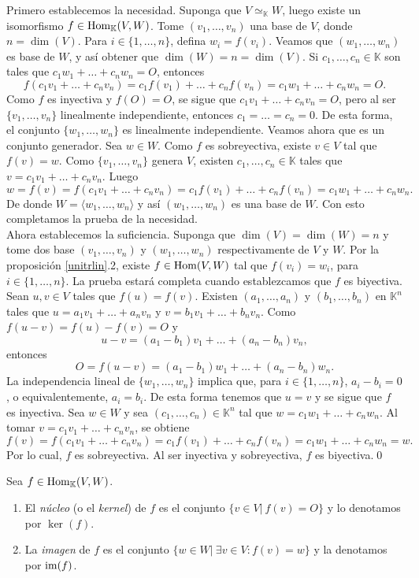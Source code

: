\dem Primero establecemos la necesidad. Suponga que $V\simeq_{\mathbb{K}} W$, luego existe un isomorfismo $f\in\operatorname{Hom}_{\mathbb{K}}(V,W)$. Tome $(v_1,\ldots,v_n)$ una base de $V$, donde $n=\dim(V)$. Para $i\in\{1,\ldots,n\}$, defina $w_i=f(v_i)$. Veamos que $(w_1,\ldots,w_n)$ es base de $W$, y así obtener que $\dim(W)=n=\dim(V)$. Si $c_1,\ldots,c_n\in \mathbb{K}$ son tales que $c_1w_1+\ldots+c_nw_n=O$, entonces
\[
f(c_1v_1+\ldots+c_nv_n)=c_1f(v_1)+\ldots+c_nf(v_n)=c_1w_1+\ldots+c_nw_n=O.
\]
Como $f$ es inyectiva y $f(O)=O$, se sigue que $c_1v_1+\ldots+c_nv_n=O$, pero al ser $\{v_1,\ldots,v_n\}$ linealmente independiente, entonces $c_1=\ldots=c_n=0$. De esta forma, el conjunto $\{w_1,\ldots,w_n\}$ es linealmente independiente. Veamos ahora que es un conjunto generador. Sea $w\in W$. Como $f$ es sobreyectiva, existe $v\in V$ tal que $f(v)=w$. Como $\{v_1,\ldots,v_n\}$ genera $V$, existen $c_1,\ldots,c_n\in \mathbb{K}$ tales que $v=c_1v_1+\ldots+c_nv_n$. Luego
\[
w=f(v)=f(c_1v_1+\ldots+c_nv_n)=c_1f(v_1)+\ldots+c_nf(v_n)=c_1w_1+\ldots+c_nw_n.
\]
De donde $W=\langle w_1,\ldots,w_n\rangle$ y as\'i $(w_1,\ldots,w_n)$ es una base de $W$. Con esto completamos la prueba de la necesidad.\\
Ahora establecemos la suficiencia. Suponga que $\dim(V)=\dim(W)=n$ y tome dos base $(v_1,\ldots,v_n)$ y $(w_1,\ldots,w_n)$ respectivamente de $V$ y $W$. Por la proposici\'on \ref{unitrlin}.2, existe $f\in\operatorname{Hom}(V,W)$ tal que $f(v_i)=w_i$, para $i\in\{1,\ldots,n\}$. La prueba estar\'a completa cuando establezcamos que $f$ es biyectiva. Sean $u,v\in V$ tales que $f(u)=f(v)$. Existen $(a_1,\ldots,a_n)$ y $(b_1,\ldots,b_n)$ en $\mathbb{K}^n$ tales que $u=a_1v_1+\ldots+a_nv_n$ y $v=b_1v_1+\ldots+b_nv_n$. Como $f(u-v)=f(u)-f(v)=O$ y
\[
u-v=(a_1-b_1)v_1+\ldots+(a_n-b_n)v_n,
\]
entonces
\[
O=f(u-v)=(a_1-b_1)w_1+\ldots+(a_n-b_n)w_n.
\]
La independencia lineal de $\{w_1,\ldots,w_n\}$ implica que, para $i\in\{1,\ldots,n\}$, $a_i-b_i=0$, o equivalentemente, $a_i=b_i$. De esta forma tenemos que $u=v$ y se sigue que $f$ es inyectiva. Sea $w\in W$ y sea $(c_1,\ldots, c_n)\in \mathbb{K}^n$ tal que $w=c_1w_1+\ldots+c_nw_n$. Al tomar $v=c_1v_1+\ldots+c_nv_n$, se obtiene
\[
f(v)=f(c_1v_1+\ldots+c_nv_n)=c_1f(v_1)+\ldots+c_nf(v_n)=c_1w_1+\ldots+c_nw_n=w.
\]
Por lo cual, $f$ es sobreyectiva. Al ser inyectiva y sobreyectiva, $f$ es biyectiva.\qed

\begin{defn}
Sea $f\in\operatorname{Hom}_{\mathbb{K}}(V,W)$.
\begin{enumerate}
\item El \emph{n\'ucleo} (o el \emph{kernel}) de $f$ es el conjunto $\{v\in V|\ f(v)=O\}$ y lo denotamos por $\ker(f)$.
\item La \emph{imagen} de $f$ es el conjunto $\{w\in W|\ \exists v\in V: f(v)=w\}$ y la denotamos por
$\operatorname{im}(f)$.
\end{enumerate}
\end{defn}

